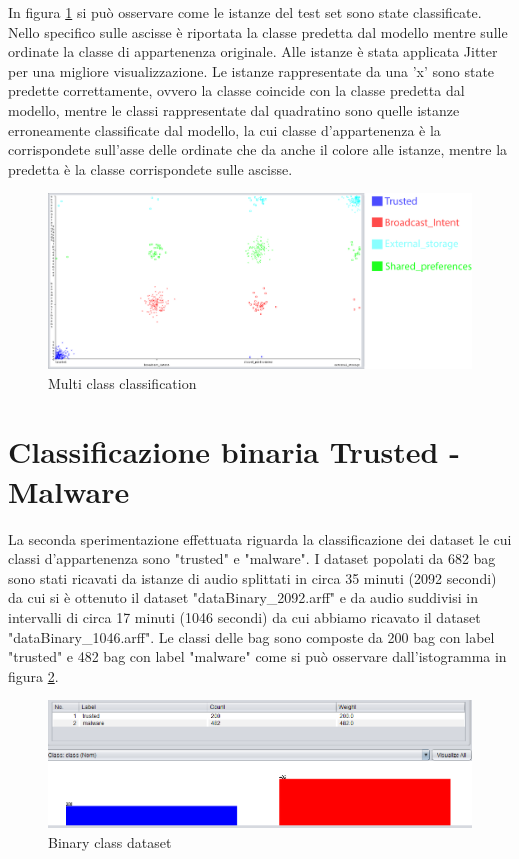 In figura \ref{fig:plotMulticlasse} si può osservare come le istanze del test set sono state classificate. Nello specifico sulle ascisse è riportata la classe predetta dal modello mentre sulle ordinate la classe di appartenenza originale. Alle istanze è stata applicata Jitter per una migliore visualizzazione. Le istanze rappresentate da una 'x' sono state predette correttamente, ovvero la classe coincide con la classe predetta dal modello, mentre le classi rappresentate dal quadratino sono quelle istanze erroneamente classificate dal modello, la cui classe d'appartenenza è la corrispondete sull'asse delle ordinate che da anche il colore alle istanze, mentre la predetta è la classe corrispondete sulle ascisse. 
\begin{figure}[h]
\centering
    \includegraphics[width=0.9\linewidth]{imgs/capitolo5/multicalsse/data_multiclass_visual.png} 
    \caption{Multi class classification}
    \label{fig:plotMulticlasse}
\end{figure}
\FloatBarrier

\section{Classificazione binaria Trusted - Malware}
La seconda sperimentazione effettuata riguarda la classificazione dei dataset le cui classi d'appartenenza sono "trusted" e "malware". I dataset popolati da 682 bag sono stati ricavati da istanze di audio splittati in circa  35 minuti (2092 secondi) da cui si è ottenuto il dataset "dataBinary\_2092.arff" e da audio suddivisi in intervalli di circa 17 minuti (1046 secondi) da cui abbiamo ricavato il dataset "dataBinary\_1046.arff". Le classi delle bag sono composte da 200 bag con label "trusted" e 482 bag con label "malware" come si può osservare dall'istogramma in figura \ref{fig:bindataset}.
\begin{figure}[h]
\centering
    \includegraphics[width=0.9\linewidth]{imgs/capitolo5/multicalsse/binaryclass.png} 
    \caption{Binary class dataset}
    \label{fig:bindataset}
\end{figure}
\FloatBarrier


